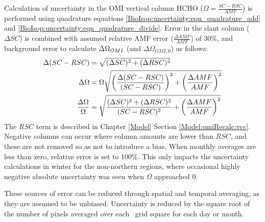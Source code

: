 \begin{description}
        Calculation of uncertainty in the OMI vertical column HCHO ($\Omega  = \frac{SC - RSC}{AMF}$) is performed using quadrature equations \ref{BioIsop:uncertainty:eqn_quadrature_add} and \ref{BioIsop:uncertainty:eqn_quadrature_divide}.
        Error in the slant column ($\Delta SC$) is combined with assumed relative AMF error ($\frac{\Delta AMF}{AMF}$) of 30\%, and background error to calculate $\Delta \Omega_{OMI}$ (and $\Delta \Omega_{OMI,0}$) as follows:
        \begin{align}
        \Delta (SC-RSC) & = \sqrt{(\Delta SC)^2 + (\Delta RSC)^2} \notag \\
        \Delta \Omega   & = \Omega \sqrt{ \left( \frac{\Delta (SC-RSC)}{(SC-RSC)} \right)^2 + \left( \frac{\Delta AMF}{AMF} \right)^2 } \notag \\
        \frac{\Delta \Omega}{\Omega} & = \sqrt{ \frac{ (\Delta SC)^2 + (\Delta RSC)^2}{(SC-RSC)^2} + \left( \frac{\Delta AMF}{AMF} \right)^2 } \label{BioIsop:uncertainty:satellite:eqn_VCC_uncertainty} 
        \end{align}
        The $RSC$ term is described in Chapter \ref{Model} Section \ref{Model:omiRecalc:vcc}.
        Negative columns can occur where column amounts are lower than $RSC$, and these are not removed so as not to introduce a bias.
        When monthly averages are less than zero, relative error is set to 100\%.
        This only impacts the uncertainty calculations in winter for the non-northern regions, where occasional highly negative absolute uncertainty was seen when $\Omega$ approached 0.
        
        
        
        
    \end{description}
    These sources of error can be reduced through spatial and temporal averaging, as they are assumed to be unbiased.
    Uncertainty is reduced by the square root of the number of pixels averaged over each \lowhr ~grid square for each day or month.

